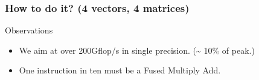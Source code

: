 \documentclass{beamer}
\begin{document}
\begin{frame}
  \frametitle{How to do it? (4 vectors, 4 matrices)}

  \begin{block}{Observations}
    \begin{itemize}
    \item We aim at over 200Gflop/s in single precision. (\~{}  10\% of peak.)
    \item One instruction in ten must be a Fused Multiply Add.
    \end{itemize}
  \end{block}
  
  \begin{figure}
    \centering
  \end{figure}  
\end{frame}
\end{document}
